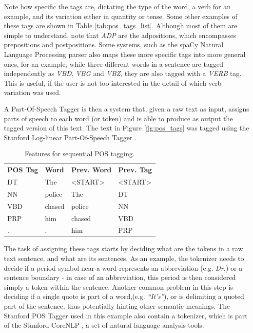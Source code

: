 \documentclass[11pt,a4paper,openright]{memoir}
\begin{document}
Note how specific the tags are, dictating the type of the word, a verb for an example, and its variation either in quantity or tense. Some other examples of these tags are shown in Table \ref{tab:pos_tags_list}. Although most of them are simple to understand, note that \emph{ADP} are the adpositions, which encompasses prepositions and postpositions. Some systems, such as the spaCy Natural Language Processing parser \cite{honnibal-johnson:2015:EMNLP, spacy} also maps these more specific tags into more general ones, for an example, while three different words in a sentence are tagged independently as \emph{VBD}, \emph{VBG} and \emph{VBZ}, they are also tagged with a \emph{VERB} tag. This is useful, if the user is not too interested in the detail of which verb variation was used.

A Part-Of-Speech Tagger is then a system that, given a raw text as input, assigns parts of speech to each word (or token) and is able to produce as output the tagged version of this text. The text in Figure \ref{fig:pos_tags} was tagged using the Stanford Log-linear Part-Of-Speech Tagger \cite{Toutanova:2003:FPT:1073445.1073478}.

\begin{table}[!htbp]
  \centering
    \begin{tabular}{llll}
      \textbf{POS Tag} & \textbf{Word} & \textbf{Prev. Word} & \textbf{Prev. Tag}  \\
      DT               & The           & <START>             & <START>             \\
      NN               & police        & The                 & DT                  \\
      VBD              & chased        & police              & NN                  \\
      PRP              & him           & chased              & VBD                 \\
      .                & .             & him                 & PRP                 \\             
    \end{tabular}
  \caption[Features for sequential POS tagging.]{Features for sequential POS tagging.}
  \label{tab:pos_tags_features}
\end{table}

The task of assigning these tags starts by deciding what are the tokens in a raw text sentence, and what are its sentences. As an example, the tokenizer needs to decide if a period symbol near a word represents an abbreviation (e.g. \emph{Dr.}) or a sentence boundary - in case of an abbreviation, this period is then considered simply a token within the sentence. Another common problem in this step is deciding if a single quote is part of a word,(e.g. \emph{\enquote{It's}}), or is delimiting a quoted part of the sentence, thus potentially hinting other semantic meanings. The Stanford POS Tagger used in this example also contain a tokenizer, which is part of the Stanford CoreNLP \cite{manning-EtAl:2014:P14-5}, a set of natural language analysis tools.
\end{document}
